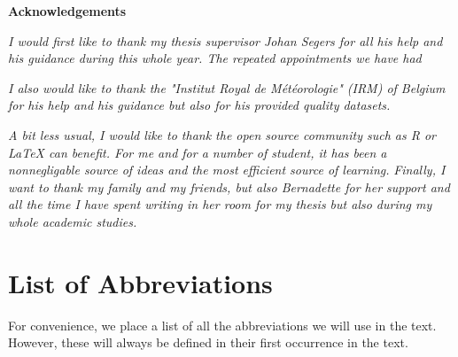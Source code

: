 \documentclass[11pt,a4paper,openany, twosided]{book}
\newcommand\blankpage{%
    \null
    \thispagestyle{empty}%
    \addtocounter{page}{-1}%
    \newpage}
\begin{document}
\newpage




\newenvironment{acknowledgements}%
{\thispagestyle{empty}\null\vfill\begin{center}%
\bfseries Acknowledgements\end{center}}%
{\vfill\null}
\begin{acknowledgements}
	\textit{I would first like to thank my thesis supervisor Johan Segers for all his help and his guidance during this whole year. The repeated appointments we have had   }
	\newline
	
	\textit{I also would like to thank the "Institut Royal de Météorologie" (IRM) of Belgium for his help and his guidance but also for his provided quality datasets.}
	\newline
	
	\textit{A bit less usual, I would like to thank the open source community such as R or LaTeX can benefit. For me and for a number of student, it has been a nonnegligable source of ideas and the most efficient source of learning.  }
			\newline
	\textit{Finally, I want to thank my family and my friends, but also Bernadette for her support and all the time I have spent  writing in her room for my thesis but also during my whole academic studies.}
	
	\thispagestyle{empty}
\end{acknowledgements}


\afterpage{\blankpage}


\thispagestyle{empty}
\dominitoc
\thispagestyle{empty}
\tableofcontents
\thispagestyle{empty}
\newpage
\thispagestyle{empty}
\listoffigures
\thispagestyle{empty}
\listoftables
\thispagestyle{empty}

\newpage


\chapter*{List of Abbreviations}
\thispagestyle{empty}
For convenience, we place a list of all the abbreviations we will use in the text. However, these will always be defined in their first occurrence in the text.\\
\end{document}
